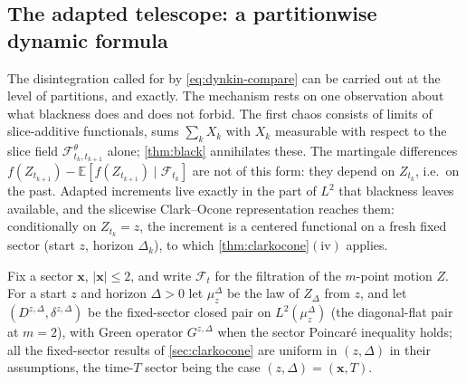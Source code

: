 \documentclass[reqno,final,11pt]{amsart}
\theoremstyle{plain}
\theoremstyle{definition}
\theoremstyle{remark}
\newcommand{\E}{\mathbb E}
\newcommand{\cF}{\mathcal F}
\begin{document}
\subsection{The adapted telescope: a partitionwise dynamic formula}
\label{subsec:dynamic}

The disintegration called for by \eqref{eq:dynkin-compare} can be carried out
at the level of partitions, and exactly. The mechanism rests on one
observation about what blackness does and does not forbid. The first chaos
consists of limits of slice-additive functionals, sums
$\sum_kX_k$ with $X_k$ measurable with respect to the slice field
$\cF^\theta_{t_k,t_{k+1}}$ alone; \cref{thm:black} annihilates these.
The martingale differences $f(Z_{t_{k+1}})-\E[f(Z_{t_{k+1}})\mid\cF_{t_k}]$ are
not of this form: they depend on $Z_{t_k}$, i.e.\ on the past. Adapted
increments live exactly in the part of $L^2$ that blackness leaves available,
and the slicewise Clark--Ocone representation reaches them: conditionally on
$Z_{t_k}=z$, the increment is a centered functional on a fresh fixed sector
(start $z$, horizon $\Delta_k$), to which \cref{thm:clarkocone}$(\mathrm{iv})$
applies.

Fix a sector $\mathbf x$, $|\mathbf x|\le2$, and write $\cF_t$ for the
filtration of the $m$-point motion $Z$. For a start $z$ and horizon
$\Delta>0$ let $\mu^{\Delta}_z$ be the law of $Z_\Delta$ from $z$, and let
$(D^{z,\Delta},\delta^{z,\Delta})$ be the fixed-sector closed pair on
$L^2(\mu^{\Delta}_z)$ (the diagonal-flat pair at $m=2$), with Green operator
$G^{z,\Delta}$ when the sector Poincar\'e inequality holds; all the
fixed-sector results of \cref{sec:clarkocone} are uniform in $(z,\Delta)$ in
their assumptions, the time-$T$ sector being the case $(z,\Delta)=(\mathbf x,T)$.
\end{document}
